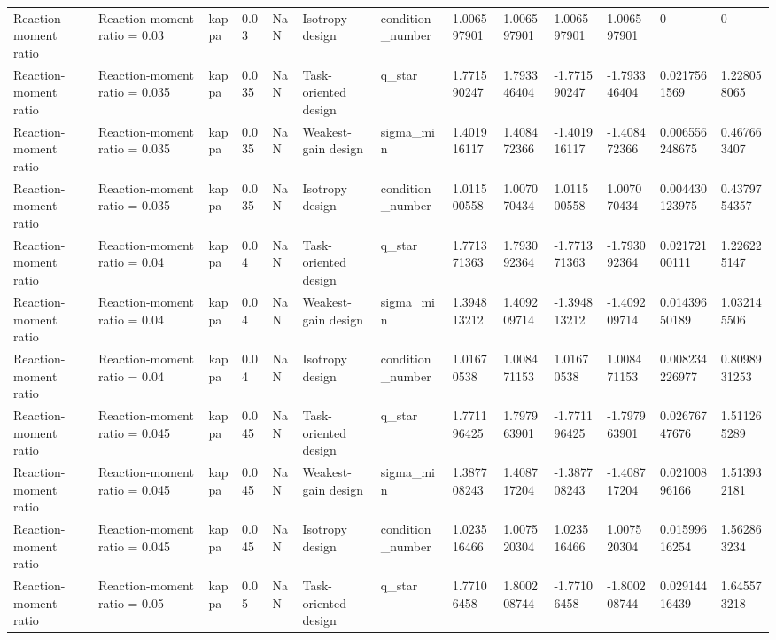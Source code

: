 \begin{tabular}{@{}lllllllllllll@{}}
Reaction-moment ratio & Reaction-moment ratio = 0.03 & kappa & 0.03 & NaN & Isotropy design & condition\_number & 1.006597901 & 1.006597901 & 1.006597901 & 1.006597901 & 0 & 0 \\
Reaction-moment ratio & Reaction-moment ratio = 0.035 & kappa & 0.035 & NaN & Task-oriented design & q\_star & 1.771590247 & 1.793346404 & -1.771590247 & -1.793346404 & 0.0217561569 & 1.228058065 \\
Reaction-moment ratio & Reaction-moment ratio = 0.035 & kappa & 0.035 & NaN & Weakest-gain design & sigma\_min & 1.401916117 & 1.408472366 & -1.401916117 & -1.408472366 & 0.006556248675 & 0.467663407 \\
Reaction-moment ratio & Reaction-moment ratio = 0.035 & kappa & 0.035 & NaN & Isotropy design & condition\_number & 1.011500558 & 1.007070434 & 1.011500558 & 1.007070434 & 0.004430123975 & 0.4379754357 \\
Reaction-moment ratio & Reaction-moment ratio = 0.04 & kappa & 0.04 & NaN & Task-oriented design & q\_star & 1.771371363 & 1.793092364 & -1.771371363 & -1.793092364 & 0.02172100111 & 1.226225147 \\
Reaction-moment ratio & Reaction-moment ratio = 0.04 & kappa & 0.04 & NaN & Weakest-gain design & sigma\_min & 1.394813212 & 1.409209714 & -1.394813212 & -1.409209714 & 0.01439650189 & 1.032145506 \\
Reaction-moment ratio & Reaction-moment ratio = 0.04 & kappa & 0.04 & NaN & Isotropy design & condition\_number & 1.01670538 & 1.008471153 & 1.01670538 & 1.008471153 & 0.008234226977 & 0.8098931253 \\
Reaction-moment ratio & Reaction-moment ratio = 0.045 & kappa & 0.045 & NaN & Task-oriented design & q\_star & 1.771196425 & 1.797963901 & -1.771196425 & -1.797963901 & 0.02676747676 & 1.511265289 \\
Reaction-moment ratio & Reaction-moment ratio = 0.045 & kappa & 0.045 & NaN & Weakest-gain design & sigma\_min & 1.387708243 & 1.408717204 & -1.387708243 & -1.408717204 & 0.02100896166 & 1.513932181 \\
Reaction-moment ratio & Reaction-moment ratio = 0.045 & kappa & 0.045 & NaN & Isotropy design & condition\_number & 1.023516466 & 1.007520304 & 1.023516466 & 1.007520304 & 0.01599616254 & 1.562863234 \\
Reaction-moment ratio & Reaction-moment ratio = 0.05 & kappa & 0.05 & NaN & Task-oriented design & q\_star & 1.77106458 & 1.800208744 & -1.77106458 & -1.800208744 & 0.02914416439 & 1.645573218 \\

\end{tabular}
